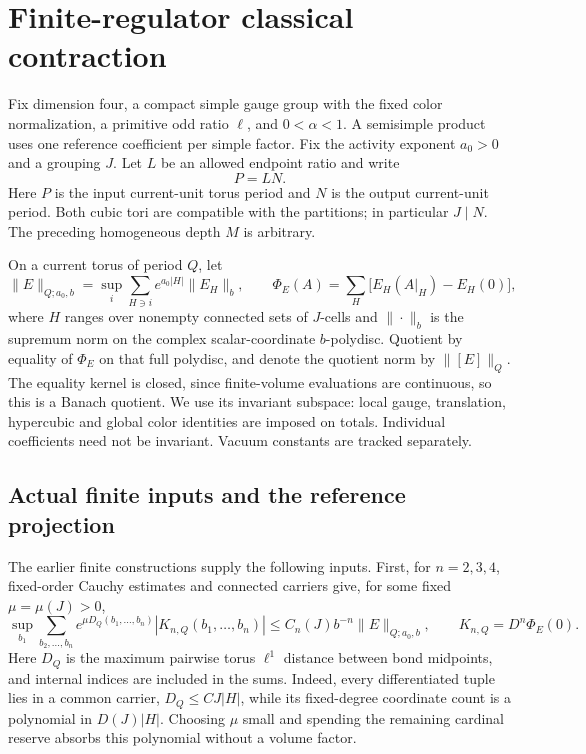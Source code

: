 \section{Finite-regulator classical contraction}
\label{fcc-section}

Fix dimension four, a compact simple gauge group with the fixed
color normalization, a primitive odd ratio \(\ell\), and
\(0<\alpha<1\). A semisimple product uses one reference coefficient
per simple factor. Fix the activity exponent \(a_0>0\) and a
grouping \(J\). Let \(L\) be an allowed endpoint ratio and write
\begin{equation}
 P=LN.
 \label{fcc-periods}
\end{equation}
Here \(P\) is the input current-unit torus period and \(N\) is
the output current-unit period. Both cubic tori are compatible
with the partitions; in particular \(J\mid N\). The preceding
homogeneous depth \(M\) is arbitrary.

On a current torus of period \(Q\), let
\begin{equation}
 \|E\|_{Q;a_0,b}
   =\sup_i\sum_{H\ni i}e^{a_0|H|}\|E_H\|_b,
 \qquad
 \Phi_E(A)=\sum_H\bigl[E_H(A|_H)-E_H(0)\bigr],
 \label{fcc-norm-total}
\end{equation}
where \(H\) ranges over nonempty connected sets of \(J\)-cells
and \(\|\cdot\|_b\) is the supremum norm on the complex
scalar-coordinate \(b\)-polydisc. Quotient by equality of
\(\Phi_E\) on that full polydisc, and denote the quotient norm by
\(\|[E]\|_Q\). The equality kernel is closed, since finite-volume
evaluations are continuous, so this is a Banach quotient.
We use its invariant subspace: local gauge, translation,
hypercubic and global color identities are imposed on totals.
Individual coefficients need not be invariant. Vacuum constants
are tracked separately.

\subsection{Actual finite inputs and the reference projection}
\label{fcc-inputs}

The earlier finite constructions supply the following inputs.
First, for \(n=2,3,4\), fixed-order Cauchy estimates and connected
carriers give, for some fixed \(\mu=\mu(J)>0\),
\begin{equation}
 \sup_{b_1}\sum_{b_2,\ldots,b_n}
 e^{\mu D_Q(b_1,\ldots,b_n)}
 |K_{n,Q}(b_1,\ldots,b_n)|
 \le C_n(J)b^{-n}\|E\|_{Q;a_0,b},
 \qquad K_{n,Q}=D^n\Phi_E(0).
 \label{fcc-kernel-bound}
\end{equation}
Here \(D_Q\) is the maximum pairwise torus \(\ell^1\) distance
between bond midpoints, and internal indices are included in
the sums. Indeed, every differentiated tuple lies in a common
carrier, \(D_Q\le C J|H|\), while its fixed-degree coordinate
count is a polynomial in \(D(J)|H|\). Choosing \(\mu\) small
and spending the remaining cardinal reserve absorbs this
polynomial without a volume factor.


